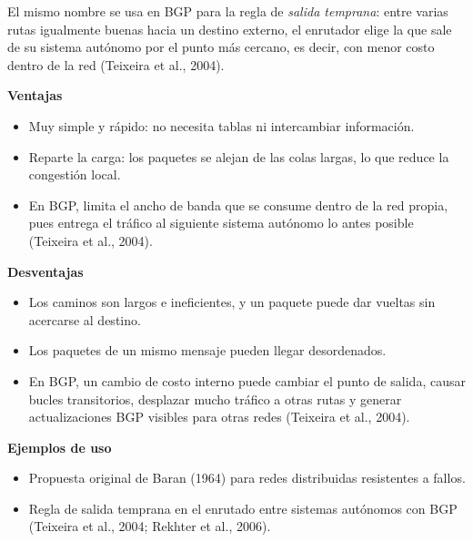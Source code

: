 \documentclass[12pt,letterpaper]{article}
\newcommand{\rub}[1]{\par\medskip\noindent\textbf{#1}\par\nopagebreak}
\begin{document}
El mismo nombre se usa en BGP para la regla de \emph{salida temprana}: entre varias rutas igualmente buenas hacia un destino externo, el enrutador elige la que sale de su sistema autónomo por el punto más cercano, es decir, con menor costo dentro de la red (Teixeira et al., 2004).
\rub{Ventajas}
\begin{itemize}[itemsep=2pt]
\item Muy simple y rápido: no necesita tablas ni intercambiar información.
\item Reparte la carga: los paquetes se alejan de las colas largas, lo que reduce la congestión local.
\item En BGP, limita el ancho de banda que se consume dentro de la red propia, pues entrega el tráfico al siguiente sistema autónomo lo antes posible (Teixeira et al., 2004).
\end{itemize}
\rub{Desventajas}
\begin{itemize}[itemsep=2pt]
\item Los caminos son largos e ineficientes, y un paquete puede dar vueltas sin acercarse al destino.
\item Los paquetes de un mismo mensaje pueden llegar desordenados.
\item En BGP, un cambio de costo interno puede cambiar el punto de salida, causar bucles transitorios, desplazar mucho tráfico a otras rutas y generar actualizaciones BGP visibles para otras redes (Teixeira et al., 2004).
\end{itemize}
\rub{Ejemplos de uso}
\begin{itemize}[itemsep=2pt]
\item Propuesta original de Baran (1964) para redes distribuidas resistentes a fallos.
\item Regla de salida temprana en el enrutado entre sistemas autónomos con BGP (Teixeira et al., 2004; Rekhter et al., 2006).
\end{itemize}
\end{document}
